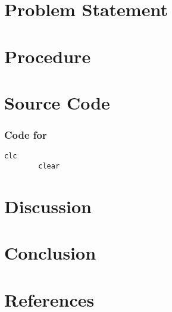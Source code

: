 \documentclass[a4paper,11pt]{article}
\begin{document}
\thispagestyle{empty}

\blankpage

\tableofcontents
\blankpage

\section{Problem Statement}

\section{Procedure}

\section{Source Code}
\subsubsection{Code for}
\lstset{language = Matlab}
    \begin{lstlisting}[basicstyle=\tiny]
        clc
        clear 
\end{lstlisting}

\section{Discussion}

\section{Conclusion}

\section{References}
\end{document}
